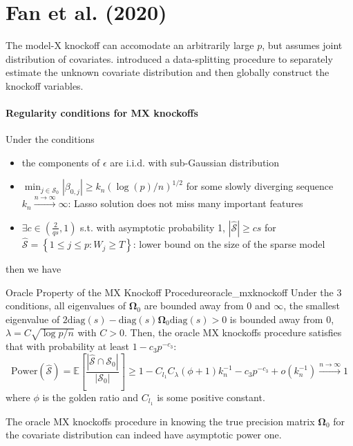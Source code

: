 \documentclass[twoside]{article}
\begin{document}
\section{Fan et al. (2020)}
The model-X knockoff \citep{candes2018panning} can accomodate an arbitrarily large $p$, but assumes  joint distribution of covariates. \citet{fan2020rank} introduced a data-splitting procedure to separately estimate the unknown covariate distribution and then globally construct the knockoff variables.

\paragraph*{Regularity conditions for MX knockoffs} Under the conditions 
\begin{itemize}
    \item the components of $\epsilon$ are i.i.d. with sub-Gaussian distribution 
    \item $\min_{j\in \mathcal{S_0}} \left\vert \beta_{0,j} \right\vert \geq k_n\left( \log (p)/n \right)^{1/2}$ for some slowly diverging sequence $k_n\xrightarrow{n\rightarrow\infty} \infty$: Lasso solution does not miss many important features
    \item $\exists c\in \left( \frac{2}{qs},1 \right)$ s.t. with asymptotic probability 1, $\left\vert \hat{\mathcal{S}} \right\vert \geq cs$ for $\hat{\mathcal{S}} = \left\{ 1\leq j\leq p: W_j\geq T \right\}$: lower bound on the size of the sparse model
\end{itemize}
then we have
\begin{theorem}{Oracle Property of the MX Knockoff Procedure}{oracle_mxknockoff}
    Under the 3 conditions, all eigenvalues of $\boldsymbol{\Omega}_0$ are bounded away from 0 and $\infty$, the smallest eigenvalue of $2\mathrm{diag}(s)-\mathrm{diag}(s)\boldsymbol{\Omega}_0 \mathrm{diag}(s)>0$ is bounded away from 0, $\lambda = C\sqrt{\log p/n}$ with $C>0$. Then, the oracle MX knockoffs procedure satisfies that with probability at least $1-c_3p^{-c_3}$:
    $$
    \mathrm{Power}(\hat{\mathcal{S}}) = \mathbb{E}\left[ \frac{\left\vert \hat{\mathcal{S}}\cap \mathcal{S}_0 \right\vert}{\left\vert \mathcal{S}_0 \right\vert} \right] \geq 1 - C_{l_1}C_{\lambda}(\phi +1)k_n^{-1} - c_3 p^{-c_3} + o(k_n^{-1}) \xrightarrow{n\rightarrow \infty} 1
    $$
    where $\phi$ is the golden ratio and $C_{l_1}$ is some positive constant.
\end{theorem}
The oracle MX knockoffs procedure in knowing the true precision matrix $\boldsymbol{\Omega}_0$ for the covariate distribution can indeed have asymptotic power one.
\end{document}
